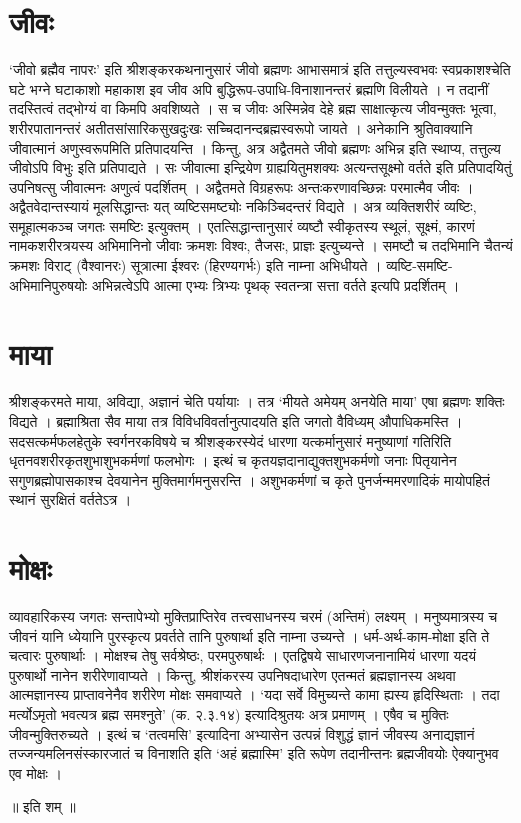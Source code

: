 \section*{जीवः}

‘जीवो ब्रह्मैव नापरः’ इति श्रीशङ्करकथनानुसारं जीवो ब्रह्मणः आभासमात्रं इति तत्तुल्यस्वभवः स्वप्रकाशश्चेति घटे भग्ने घटाकाशो महाकाश इव जीव अपि बुद्धिरूप-उपाधि-विनाशानन्तरं ब्रह्मणि विलीयते । न तदानीं तदस्तित्वं तद्भोग्यं वा किमपि अवशिष्यते । स च जीवः अस्मिन्नेव देहे ब्रह्म साक्षात्कृत्य जीवन्मुक्तः भूत्वा, शरीरपातानन्तरं अतीतसांसारिकसुखदुःखः सच्चिदानन्दब्रह्मस्वरूपो जायते ।
अनेकानि श्रुतिवाक्यानि जीवात्मानं अणुस्वरूपमिति प्रतिपादयन्ति । किन्तु, अत्र अद्वैतमते जीवो ब्रह्मणः अभिन्न इति स्थाप्य, तत्तुल्य जीवोऽपि विभुः इति प्रतिपाद्यते । सः जीवात्मा इन्द्रियेण ग्राह्ययितुमशक्यः अत्यन्तसूक्ष्मो वर्तते इति प्रतिपादयितुं उपनिषत्सु जीवात्मनः अणुत्वं पदर्शितम् । अद्वैतमते विग्रहरूपः अन्तःकरणावच्छिन्नः परमात्मैव जीवः ।
अद्वैतवेदान्तस्यायं मूलसिद्धान्तः यत् व्यष्टिसमष्ट्योः नकिञ्चिदन्तरं विद्यते । अत्र व्यक्तिशरीरं व्यष्टिः, समूहात्मकञ्च जगतः समष्टिः इत्युक्तम् । एतत्सिद्धान्तानुसारं व्यष्टौ स्वीकृतस्य स्थूलं, सूक्ष्मं, कारणं नामकशरीरत्रयस्य अभिमानिनो जीवाः क्रमशः विश्वः, तैजसः, प्राज्ञः इत्युच्यन्ते । समष्टौ च तदभिमानि चैतन्यं क्रमशः विराट् (वैश्वानरः) सूत्रात्मा ईश्वरः (हिरण्यगर्भः) इति नाम्ना अभिधीयते । व्यष्टि-समष्टि-अभिमानिपुरुषयोः अभिन्नत्वेऽपि आत्मा एभ्यः त्रिभ्यः पृथक् स्वतन्त्रा सत्ता वर्तते इत्यपि प्रदर्शितम् ।

\section*{माया}

श्रीशङ्करमते माया, अविद्या, अज्ञानं चेति पर्यायाः । तत्र ‘मीयते अमेयम् अनयेति माया’ एषा ब्रह्मणः शक्तिः विद्यते । ब्रह्माश्रिता सैव माया तत्र विविधविवर्तानुत्पादयति इति जगतो वैविध्यम् औपाधिकमस्ति । सदसत्कर्मफलहेतुके स्वर्गनरकविषये च श्रीशङ्करस्येदं धारणा यत्कर्मानुसारं मनुष्याणां गतिरिति धृतनवशरीरकृतशुभाशुभकर्मणां फलभोगः । इत्थं च कृतयज्ञदानाद्युक्तशुभकर्मणो जनाः पितृयानेन सगुणब्रह्मोपासकाश्च देवयानेन मुक्तिमार्गमनुसरन्ति । अशुभकर्मणां च कृते पुनर्जन्ममरणादिकं मायोपहितं स्थानं सुरक्षितं वर्ततेऽत्र ।

\section*{मोक्षः}

व्यावहारिकस्य जगतः सन्तापेभ्यो मुक्तिप्राप्तिरेव तत्त्वसाधनस्य चरमं (अन्तिमं) लक्ष्यम् । मनुष्यमात्रस्य च जीवनं यानि ध्येयानि पुरस्कृत्य प्रवर्तते तानि पुरुषार्था इति नाम्ना उच्यन्ते । धर्म-अर्थ-काम-मोक्षा इति ते चत्वारः पुरुषार्थाः । मोक्षश्च तेषु सर्वश्रेष्ठः, परमपुरुषार्थः । एतद्विषये साधारणजनानामियं धारणा यदयं पुरुषार्थो नानेन शरीरेणावाप्यते । किन्तु, श्रीशंकरस्य उपनिषदाधारेण एतन्मतं ब्रह्मज्ञानस्य अथवा आत्मज्ञानस्य प्राप्तावनेनैव शरीरेण मोक्षः समवाप्यते । ‘यदा सर्वे विमुच्यन्ते कामा ह्यस्य हृदिस्थिताः । तदा मर्त्योऽमृतो भवत्यत्र ब्रह्म समश्नुते’ (क. २.३.१४) इत्यादिश्रुतयः अत्र प्रमाणम् । एषैव च मुक्तिः जीवन्मुक्तिरुच्यते । इत्थं च ‘तत्वमसि’ इत्यादिना अभ्यासेन उत्पन्नं विशुद्धं ज्ञानं जीवस्य अनाद्यज्ञानं तज्जन्यमलिनसंस्कारजातं च विनाशति इति ‘अहं ब्रह्मास्मि’ इति रूपेण तदानीन्तनः ब्रह्मजीवयोः ऐक्यानुभव एव मोक्षः । 

॥ इति शम् ॥
